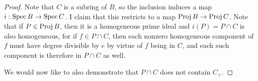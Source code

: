 \begin{proof}
	Note that $C$ is a subring of $B$, so the inclusion induces a map $i : \operatorname{Spec} B \to \operatorname{Spec} C$. I claim that this restricts to a map $\operatorname{Proj} B \to \operatorname{Proj} C$. Note that if $P \in \operatorname{Proj} B$, then it is a homogeneous prime ideal and $i(P) = P \cap C$ is also homogeneous, for if $f \in P \cap C$, then each nonzero homogeneous component of $f$ must have degree divisible by $e$ by virtue of $f$ being in $C$, and each such component is therefore in $P \cap C$ as well.
	
	We would now like to also demonstrate that $P \cap C$ does not contain $C_{+}$.
\end{proof}
